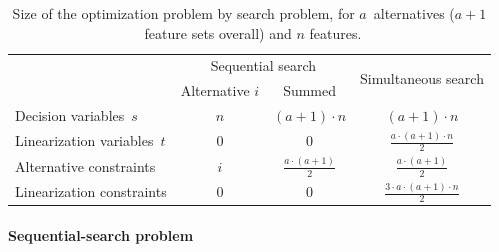 \documentclass{article}
\theoremstyle{definition}
\begin{document}
\begin{table}[t]
	\centering
	\renewcommand*{\arraystretch}{1.3}
	\begin{tabular}{lccc}
		\toprule
		& \multicolumn{2}{c}{Sequential search} & \multirow{2}{*}{Simultaneous search} \\
		\cmidrule(r){2-3}
		& Alternative $i$ & Summed & \\
		\midrule
		Decision variables~$s$ & $n$ & $ (a+1) \cdot n$ & $(a+1) \cdot n$ \\
		Linearization variables~$t$ & $0$ & $0$ & $\frac{a \cdot (a+1) \cdot n}{2}$ \\
		Alternative constraints & $i$ & $\frac{a \cdot (a+1)}{2}$ & $\frac{a \cdot (a+1)}{2}$ \\
		Linearization constraints & $0$ & $0$ & $\frac{3 \cdot a \cdot (a+1) \cdot n}{2}$ \\
		\bottomrule
	\end{tabular}
	\caption{Size of the optimization problem by search problem, for $a$~alternatives ($a + 1$~feature sets overall) and $n$ features.}
	\label{tab:afs:seq-sim-comparison}
\end{table}

\paragraph{Sequential-search problem}
\end{document}
